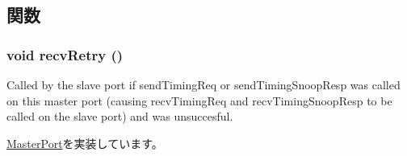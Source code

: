 \subsection{関数}
\hypertarget{classTimingSimpleCPU_1_1DcachePort_a29cb5a4f98063ce6e9210eacbdb35298}{
\subsubsection[{recvRetry}]{\setlength{\rightskip}{0pt plus 5cm}void recvRetry ()}}
\label{classTimingSimpleCPU_1_1DcachePort_a29cb5a4f98063ce6e9210eacbdb35298}
Called by the slave port if sendTimingReq or sendTimingSnoopResp was called on this master port (causing recvTimingReq and recvTimingSnoopResp to be called on the slave port) and was unsuccesful. 

\hyperlink{classMasterPort_ac1ccc3bcf7ebabb20b57fab99b2be5b0}{MasterPort}を実装しています。


